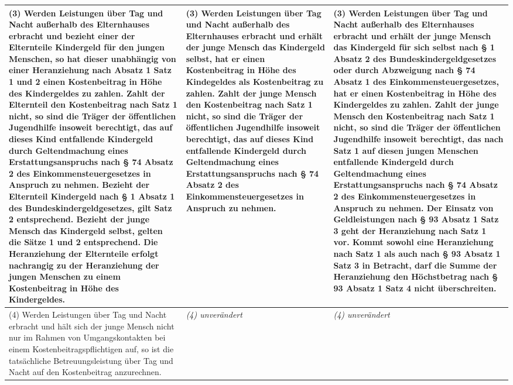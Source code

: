 \documentclass[10pt,a4paper,landscape]{article}
\begin{document}
\begin{longtable}{|L{8.6cm}|L{8.6cm}|L{8.6cm}|}
\hline
(3) Werden Leistungen über Tag und Nacht außerhalb des Elternhauses erbracht und bezieht einer der Elternteile Kindergeld für den jungen Menschen, so hat dieser unabhängig von einer Heranziehung nach Absatz 1 Satz 1 und 2 einen Kostenbeitrag in Höhe des Kindergeldes zu zahlen. Zahlt der Elternteil den Kostenbeitrag nach Satz 1 nicht, so sind die Träger der öffentlichen Jugendhilfe insoweit berechtigt, das auf dieses Kind entfallende Kindergeld durch Geltendmachung eines Erstattungsanspruchs nach \S{} 74 Absatz 2 des Einkommensteuergesetzes in Anspruch zu nehmen. Bezieht der Elternteil Kindergeld nach \S{} 1 Absatz 1 des Bundeskindergeldgesetzes, gilt Satz 2 entsprechend. Bezieht der junge Mensch das Kindergeld selbst, gelten die Sätze 1 und 2 entsprechend. Die Heranziehung der Elternteile erfolgt nachrangig zu der Heranziehung der jungen Menschen zu einem Kostenbeitrag in Höhe des Kindergeldes. & (3) Werden Leistungen über Tag und Nacht außerhalb des Elternhauses erbracht und \textbf{erhält der junge Mensch das Kindergeld selbst, hat er einen Kostenbeitrag in Höhe des Kindegeldes als Kostenbeitrag zu zahlen.} Zahlt der \textbf{junge Mensch} den Kostenbeitrag nach Satz 1 nicht, so sind die Träger der öffentlichen Jugendhilfe insoweit berechtigt, das auf dieses Kind entfallende Kindergeld durch Geltendmachung eines Erstattungsanspruchs nach \S{} 74 Absatz 2 des Einkommensteuergesetzes in Anspruch zu nehmen. & \textbf{(3) Werden Leistungen über Tag und Nacht außerhalb des Elternhauses erbracht und erhält der junge Mensch das Kindergeld für sich selbst nach \S{} 1 Absatz 2 des Bundeskindergeldgesetzes oder durch Abzweigung nach \S{} 74 Absatz 1 des Einkommensteuergesetzes, hat er einen Kostenbeitrag in Höhe des Kindergeldes zu zahlen. Zahlt der junge Mensch den Kostenbeitrag nach Satz 1 nicht, so sind die Träger der öffentlichen Jugendhilfe insoweit berechtigt, das nach Satz 1 auf diesen jungen Menschen entfallende Kindergeld durch Geltendmachung eines Erstattungsanspruchs nach \S{} 74 Absatz 2 des Einkommensteuergesetzes in Anspruch zu nehmen. Der Einsatz von Geldleistungen nach \S{} 93 Absatz 1 Satz 3 geht der Heranziehung nach Satz 1 vor. Kommt sowohl eine Heranziehung nach Satz 1 als auch nach \S{} 93 Absatz 1 Satz 3 in Betracht, darf die Summe der Heranziehung den Höchstbetrag nach \S{} 93 Absatz 1 Satz 4 nicht überschreiten. } \\
\hline
(4) Werden Leistungen über Tag und Nacht erbracht und hält sich der junge Mensch nicht nur im Rahmen von Umgangskontakten bei einem Kostenbeitragspflichtigen auf, so ist die tatsächliche Betreuungsleistung über Tag und Nacht auf den Kostenbeitrag anzurechnen. & \textit{(4) unverändert} & \textit{(4) unverändert} \\

\end{longtable}
\end{document}
